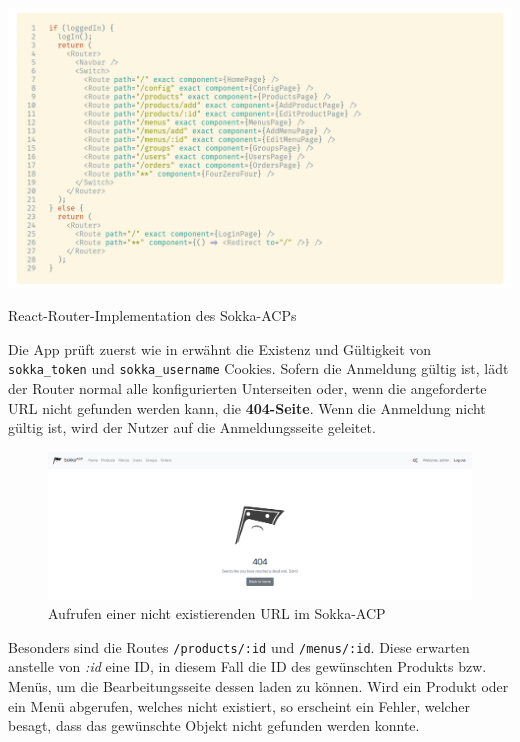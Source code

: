\begin{code}[htp]
    \centering
    \includegraphics[width=1\textwidth]{images/ACP/routing.png}
    \vspace{-25pt}
    \caption{React-Router-Implementation des Sokka-ACPs}
\end{code}

\pagebreak

Die App prüft zuerst wie in \textit{} erwähnt die Existenz und Gültigkeit von \lstinline{sokka_token} und \lstinline{sokka_username} Cookies. Sofern die Anmeldung gültig ist, lädt der Router normal alle konfigurierten Unterseiten oder, wenn die angeforderte URL nicht gefunden werden kann, die \textbf{404-Seite}. Wenn die Anmeldung nicht gültig ist, wird der Nutzer auf die Anmeldungsseite geleitet.

\begin{figure}[ht]
    \centering
    \includegraphics[width=1\textwidth]{images/ACP/404.png}
    \caption{Aufrufen einer nicht existierenden URL im Sokka-ACP}
\end{figure}

Besonders sind die Routes \lstinline{/products/:id} und \lstinline{/menus/:id}. Diese erwarten anstelle von \textit{:id} eine ID, in diesem Fall die ID des gewünschten Produkts bzw. Menüs, um die Bearbeitungsseite dessen laden zu können. Wird ein Produkt oder ein Menü abgerufen, welches nicht existiert, so erscheint ein Fehler, welcher besagt, dass das gewünschte Objekt nicht gefunden werden konnte.